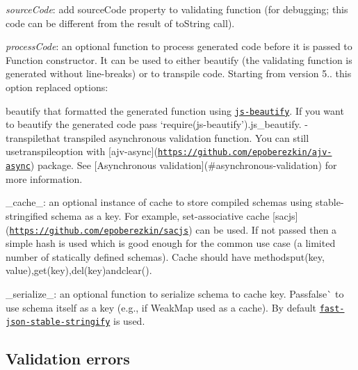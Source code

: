 \begin{DoxyItemize}
\item {\itshape source\+Code}\+: add {\ttfamily source\+Code} property to validating function (for debugging; this code can be different from the result of to\+String call).
\item {\itshape process\+Code}\+: an optional function to process generated code before it is passed to Function constructor. It can be used to either beautify (the validating function is generated without line-\/breaks) or to transpile code. Starting from version 5.. this option replaced options\+:
\begin{DoxyItemize}
\item {\ttfamily beautify} that formatted the generated function using \href{https://github.com/beautify-web/js-beautify}{\tt js-\/beautify}. If you want to beautify the generated code pass `require(\textquotesingle{}js-\/beautify').js\+\_\+beautify{\ttfamily . -\/}transpile{\ttfamily that transpiled asynchronous validation function. You can still use}transpile{\ttfamily option with \mbox{[}ajv-\/async\mbox{]}(\href{https://github.com/epoberezkin/ajv-async}{\tt https\+://github.\+com/epoberezkin/ajv-\/async}) package. See \mbox{[}Asynchronous validation\mbox{]}(\#asynchronous-\/validation) for more information.}
\end{DoxyItemize}
\item {\ttfamily \+\_\+cache\+\_\+\+: an optional instance of cache to store compiled schemas using stable-\/stringified schema as a key. For example, set-\/associative cache \mbox{[}sacjs\mbox{]}(\href{https://github.com/epoberezkin/sacjs}{\tt https\+://github.\+com/epoberezkin/sacjs}) can be used. If not passed then a simple hash is used which is good enough for the common use case (a limited number of statically defined schemas). Cache should have methods}put(key, value){\ttfamily ,}get(key){\ttfamily ,}del(key){\ttfamily and}clear(){\ttfamily .}
\item {\ttfamily \+\_\+serialize\+\_\+\+: an optional function to serialize schema to cache key. Pass}false\`{} to use schema itself as a key (e.\+g., if Weak\+Map used as a cache). By default \href{https://github.com/epoberezkin/fast-json-stable-stringify}{\tt fast-\/json-\/stable-\/stringify} is used.
\end{DoxyItemize}

\subsection*{Validation errors}


